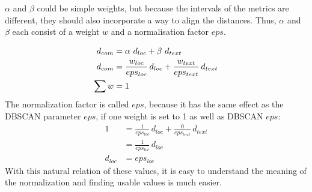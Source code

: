 $\alpha$ and $\beta$ could be simple weights, but because the intervals of the metrics are different, they should also incorporate a way to align the distances. Thus, $\alpha$ and $\beta$ each consist of a weight $w$ and a normalisation factor $eps$. 

\begin{align}
d_{com} &= \alpha \,\, d_{loc} + \beta \,\, d_{text}\notag\\
d_{com} &= \frac{w_{loc}}{eps_{loc}} \, d_{loc} + \frac{w_{text}}{eps_{text}} \, d_{text}\\
\sum w &= 1 \notag
\end{align}
%
The normalization factor is called $eps$, because it has the same effect as the DBSCAN parameter $eps$, if one weight is set to 1 as well as DBSCAN $eps$:
\begin{align*}
1 &= \frac{1}{eps_{loc}} \, d_{loc} + \frac{0}{eps_{text}} \, d_{text}\\
&= \frac{1}{eps_{loc}} \, d_{loc}\\
d_{loc} &= eps_{loc}
\end{align*}
%
With this natural relation of these values, it is easy to understand the meaning of the normalization and finding usable values is much easier.